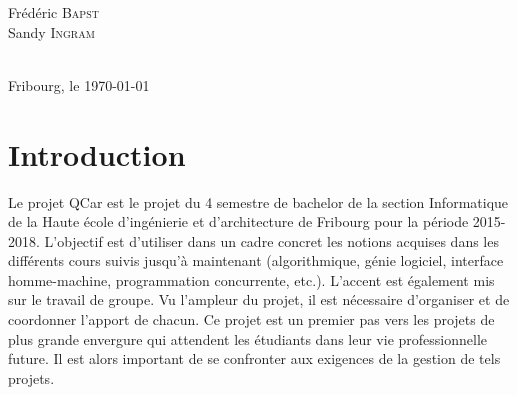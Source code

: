 \documentclass[a4paper, 12pt]{article}
\begin{document}
\begin{titlepage}
\begin{minipage}{0.4\textwidth}
\begin{flushright}
Frédéric \textsc{Bapst}\\
Sandy \textsc{Ingram}\\
\end{flushright}
\end{minipage}\\[2cm]
{\large Fribourg, le \today}\\[1cm]
\vfill %
\newpage
\end{titlepage}
\tableofcontents
\newpage
\section{Introduction}
Le projet QCar est le projet du 4 semestre de bachelor de la section Informatique de la Haute école d'ingénierie et d'architecture de Fribourg pour la période 2015-2018. L'objectif est d'utiliser dans un cadre concret les notions acquises dans les différents cours suivis jusqu'à maintenant (algorithmique, génie logiciel, interface homme-machine, programmation concurrente, etc.). L'accent est également mis sur le travail de groupe. Vu l'ampleur du projet, il est nécessaire d'organiser et de coordonner l'apport de chacun. Ce projet est un premier pas vers les projets de plus grande envergure qui attendent les étudiants dans leur vie professionnelle future. Il est alors important de se confronter aux exigences de la gestion de tels projets.
\end{document}
